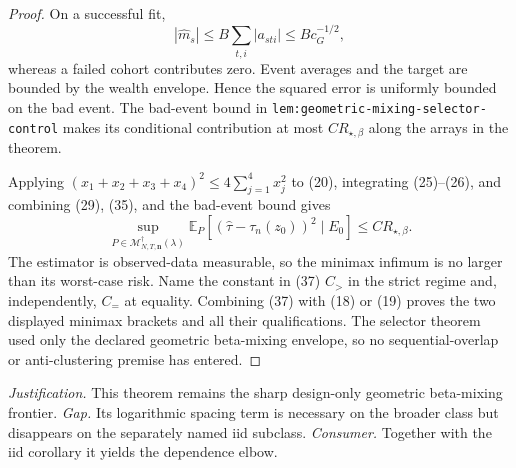 \documentclass{article}
\begin{document}
\begin{proof}
On a successful fit,
\[
|\widehat m_s|\leq B\sum_{t,i}|a_{sti}|\leq Bc_G^{-1/2},
\tag{36}
\]
whereas a failed cohort contributes zero.  Event averages and the target are bounded by the wealth envelope.  Hence the squared error is uniformly bounded on the bad event.  The bad-event bound in \texttt{lem:geometric-mixing-selector-control} makes its conditional contribution at most \(CR_{\star,\beta}\) along the arrays in the theorem.

Applying \((x_1+x_2+x_3+x_4)^2\leq4\sum_{j=1}^4x_j^2\) to (20), integrating (25)--(26), and combining (29), (35), and the bad-event bound gives
\[
\sup_{P\in\mathcal M_{N,T,\mathbf n}^{\dagger}(\lambda)}
\mathbb E_P[(\widehat\tau-\tau_n(z_0))^2\mid E_0]
\leq CR_{\star,\beta}.
\tag{37}
\]
The estimator is observed-data measurable, so the minimax infimum is no larger than its worst-case risk.  Name the constant in (37) \(C_{>}\) in the strict regime and, independently, \(C_{=}\) at equality.  Combining (37) with (18) or (19) proves the two displayed minimax brackets and all their qualifications.  The selector theorem used only the declared geometric beta-mixing envelope, so no sequential-overlap or anti-clustering premise has entered.
\end{proof}
\par\smallskip\noindent \textit{Justification.} This theorem remains the sharp design-only geometric beta-mixing frontier. \textit{Gap.} Its logarithmic spacing term is necessary on the broader class but disappears on the separately named iid subclass. \textit{Consumer.} Together with the iid corollary it yields the dependence elbow.
\end{document}

